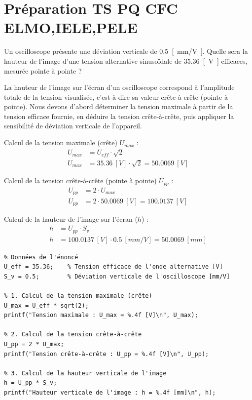 \documentclass[a4paper,12pt,answers,addpoints]{exam}
\begin{document}
	\unframedsolutions
	\pointsinmargin
	\bracketedpoints
	
\section*{Préparation TS PQ CFC ELMO,IELE,PELE}
\begin{questions}
\question[3] Un oscilloscope présente une déviation verticale de \qty{0,5}{[mm/V]}. Quelle sera la hauteur de l'image d'une tension alternative sinusoïdale de \qty{35,36}{[V]} efficaces, mesurée pointe à pointe ?

\begin{solution}
La hauteur de l'image sur l'écran d'un oscilloscope correspond à l'amplitude totale de la tension visualisée, c'est-à-dire sa valeur crête-à-crête (pointe à pointe). Nous devons d'abord déterminer la tension maximale à partir de la tension efficace fournie, en déduire la tension crête-à-crête, puis appliquer la sensibilité de déviation verticale de l'appareil.

Calcul de la tension maximale (crête) $U_{max}$ :
\begin{align*}
U_{max} &= U_{eff} \cdot \sqrt{2} \\[6pt]
U_{max} &= \qty{35,36}{[V]} \cdot \sqrt{2} = \qty{50,0069}{[V]}
\end{align*}

Calcul de la tension crête-à-crête (pointe à pointe) $U_{pp}$ :
\begin{align*}
U_{pp} &= 2 \cdot U_{max} \\[6pt]
U_{pp} &= 2 \cdot \qty{50,0069}{[V]} = \qty{100,0137}{[V]}
\end{align*}

Calcul de la hauteur de l'image sur l'écran ($h$) :
\begin{align*}
h &= U_{pp} \cdot S_v \\[6pt]
h &= \qty{100,0137}{[V]} \cdot \qty{0,5}{[mm/V]} = \qty{50,0069}{[mm]}
\end{align*}

\begin{verbatim}
% Données de l'énoncé
U_eff = 35.36;    % Tension efficace de l'onde alternative [V]
S_v = 0.5;        % Déviation verticale de l'oscilloscope [mm/V]

% 1. Calcul de la tension maximale (crête)
U_max = U_eff * sqrt(2);
printf("Tension maximale : U_max = %.4f [V]\n", U_max);

% 2. Calcul de la tension crête-à-crête
U_pp = 2 * U_max;
printf("Tension crête-à-crête : U_pp = %.4f [V]\n", U_pp);

% 3. Calcul de la hauteur verticale de l'image
h = U_pp * S_v;
printf("Hauteur verticale de l'image : h = %.4f [mm]\n", h);
\end{verbatim}
\end{solution}
\end{questions}
\end{document}

